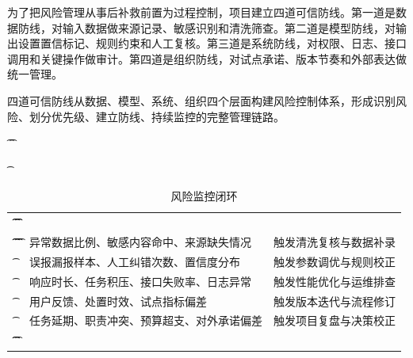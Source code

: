 为了把风险管理从事后补救前置为过程控制，项目建立四道可信防线。第一道是数据防线，对输入数据做来源记录、敏感识别和清洗筛查。第二道是模型防线，对输出设置置信标记、规则约束和人工复核。第三道是系统防线，对权限、日志、接口调用和关键操作做审计。第四道是组织防线，对试点承诺、版本节奏和外部表达做统一管理。

四道可信防线从数据、模型、系统、组织四个层面构建风险控制体系，形成识别风险、划分优先级、建立防线、持续监控的完整管理链路。

\begin{table}[htbp]
	\t\centering
	\t\caption{风险监控闭环}
	\t\begin{tabularx}{\textwidth}{|L{3cm}YL{2.8cm}|}
		\t\t\toprule
		\t\t{} &         &  \\
		\t\t\midrule
		\t\t{}
		\t{}           & 异常数据比例、敏感内容命中、来源缺失情况  & 触发清洗复核与数据补录    \\
		\t{}           & 误报漏报样本、人工纠错次数、置信度分布   & 触发参数调优与规则校正    \\
		\t{}           & 响应时长、任务积压、接口失败率、日志异常  & 触发性能优化与运维排查    \\
		\t{}           & 用户反馈、处置时效、试点指标偏差      & 触发版本迭代与流程修订    \\
		\t{}           & 任务延期、职责冲突、预算超支、对外承诺偏差 & 触发项目复盘与决策校正    \\
		\t\t\bottomrule
		\t\end{tabularx}
\end{table}
